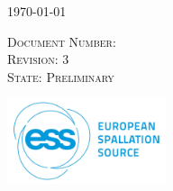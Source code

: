 \documentclass[12pt]{article}
\begin{document}
\begin{titlepage}


\vspace{7mm}
\begin{center}
{\large \today}
\end{center}
 \textsc{\small Document Number: }\\
 \textsc{\small Revision: 3}\\
  \textsc{\small State: Preliminary}\\
\vspace{21 mm}
\newcommand*{\plogo}{\includegraphics[width=0.35\textwidth]{ESS_logo.png}}

\plogo\\[1cm] %
 

\vfill %



\pagebreak
\newpage


\end{titlepage}
\end{document}
